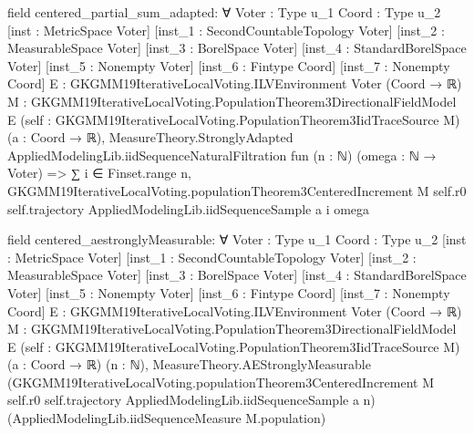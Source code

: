 \documentclass[10pt]{article}
\begin{document}
\begin{ReviewVerbatim}
field centered_partial_sum_adapted:
∀ {Voter : Type u_1} {Coord : Type u_2} [inst : MetricSpace Voter] [inst_1 : SecondCountableTopology Voter]
  [inst_2 : MeasurableSpace Voter] [inst_3 : BorelSpace Voter] [inst_4 : StandardBorelSpace Voter]
  [inst_5 : Nonempty Voter] [inst_6 : Fintype Coord] [inst_7 : Nonempty Coord]
  {E : GKGMM19IterativeLocalVoting.ILVEnvironment Voter (Coord → ℝ)}
  {M : GKGMM19IterativeLocalVoting.PopulationTheorem3DirectionalFieldModel E}
  (self : GKGMM19IterativeLocalVoting.PopulationTheorem3IidTraceSource M) (a : Coord → ℝ),
  MeasureTheory.StronglyAdapted AppliedModelingLib.iidSequenceNaturalFiltration fun (n : ℕ) (omega : ℕ → Voter) =>
    ∑ i ∈ Finset.range n,
      GKGMM19IterativeLocalVoting.populationTheorem3CenteredIncrement M self.r0 self.trajectory
        AppliedModelingLib.iidSequenceSample a i omega

field centered_aestronglyMeasurable:
∀ {Voter : Type u_1} {Coord : Type u_2} [inst : MetricSpace Voter] [inst_1 : SecondCountableTopology Voter]
  [inst_2 : MeasurableSpace Voter] [inst_3 : BorelSpace Voter] [inst_4 : StandardBorelSpace Voter]
  [inst_5 : Nonempty Voter] [inst_6 : Fintype Coord] [inst_7 : Nonempty Coord]
  {E : GKGMM19IterativeLocalVoting.ILVEnvironment Voter (Coord → ℝ)}
  {M : GKGMM19IterativeLocalVoting.PopulationTheorem3DirectionalFieldModel E}
  (self : GKGMM19IterativeLocalVoting.PopulationTheorem3IidTraceSource M) (a : Coord → ℝ) (n : ℕ),
  MeasureTheory.AEStronglyMeasurable
    (GKGMM19IterativeLocalVoting.populationTheorem3CenteredIncrement M self.r0 self.trajectory
      AppliedModelingLib.iidSequenceSample a n)
    (AppliedModelingLib.iidSequenceMeasure M.population)
\end{ReviewVerbatim}
\end{document}
